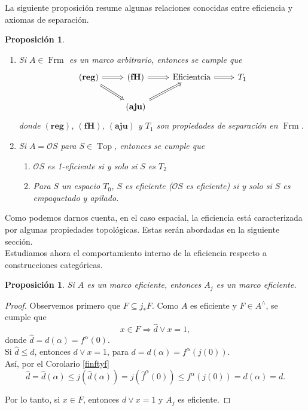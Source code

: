 \documentclass[11pt]{amsart}
\DeclareMathOperator{\Frm}{Frm}
\DeclareMathOperator{\Top}{Top}
\theoremstyle{plain}
\newtheorem{prop}[thm]{Proposición}
\theoremstyle{definition}
\begin{document}
La siguiente proposición resume algunas relaciones conocidas entre eficiencia y axiomas de separación.
\begin{prop}\label{Propiedadeseficientes}
$\mbox{}$
\begin{enumerate}
\item Si $A\in \Frm$ es un marco arbitrario, entonces se cumple que
\[\begin{tikzcd}
	{\mathbf{(reg)}} & {\mathbf{(fH)}} & {\text{Eficientcia}} & {T_1} \\
	& {\mathbf{(aju)}}
	\arrow[Rightarrow, from=1-1, to=1-2]
	\arrow[Rightarrow, from=1-1, to=2-2]
	\arrow[Rightarrow, from=1-2, to=1-3]
	\arrow[Rightarrow, from=1-3, to=1-4]
	\arrow[Rightarrow, from=2-2, to=1-3]
\end{tikzcd}\]
donde $\mathbf{(reg)}$, $\mathbf{(fH)}$, $\mathbf{(aju)}$ y $T_1$ son propiedades de separación en $\Frm$.
\item Si $A=\mathcal{O}S$ para $S\in \Top$, entonces se cumple que
\begin{enumerate}
    \item $\mathcal{O}S$ es 1-eficiente si y solo si $S$ es $T_2$
    \item Para $S$ un espacio $T_0$, $S$ es eficiente ($\mathcal{O}S$ es eficiente) si y solo si $S$ es empaquetado y apilado.
\end{enumerate}
\end{enumerate}
\end{prop}
Como podemos darnos cuenta, en el caso espacial, la eficiencia está caracterizada por algunas propiedades topológicas. Estas serán abordadas en la siguiente sección.\\

Estudiamos ahora el comportamiento interno de la eficiencia respecto a construcciones categóricas. 
\begin{prop}\label{tidyquout}
    Si $A$ es un marco eficiente, entonces $A_j$ es un marco eficiente.
\end{prop}

\begin{proof}
Observemos primero que $F\subseteq j_*F$. Como $A$ es eficiente y $F\in A^\wedge$, se cumple que 
\[
x\in F\Rightarrow \hat{d}\vee x=1,
\]
donde $\hat{d}=d(\alpha)=f^\alpha(0)$.\\

Si $\hat{d}\leq d$, entonces $d\vee x=1$, para $d=d(\alpha)=f^\alpha(j(0))$.\\

Así, por el Corolario \ref{finftyf}
\[
\hat{d}=\hat{d}(\alpha)\leq j(\hat{d}(\alpha))=j(\hat{f}^\alpha(0))\leq f^\alpha(j(0))=d(\alpha)=d.
\]

Por lo tanto, si $x\in F$, entonces $d\vee x=1$ y $A_j$ es eficiente.
\end{proof}
\end{document}
